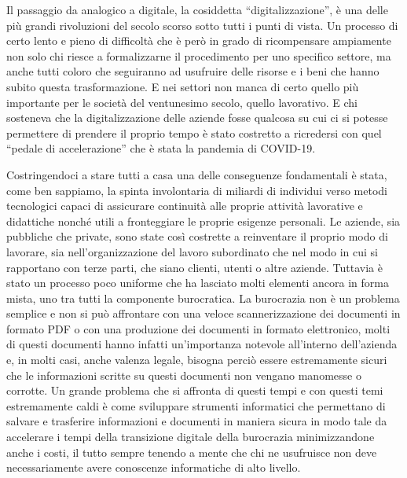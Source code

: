 Il passaggio da analogico a digitale, la cosiddetta “digitalizzazione”, è una delle più grandi
rivoluzioni del secolo scorso sotto tutti i punti di vista. Un processo di certo lento e pieno
di difficoltà che è però in grado di ricompensare ampiamente non solo chi riesce a
formalizzarne il procedimento per uno specifico settore, ma anche tutti coloro che
seguiranno ad usufruire delle risorse e i beni che hanno subito questa trasformazione.
E nei settori non manca di certo quello più importante per le società del ventunesimo secolo,
quello lavorativo. E chi sosteneva che la digitalizzazione delle aziende fosse qualcosa su cui
ci si potesse permettere di prendere il proprio tempo è stato costretto a ricredersi con quel
“pedale di accelerazione” che è stata la pandemia di COVID-19.

Costringendoci a stare tutti a casa una delle conseguenze fondamentali è stata,
come ben sappiamo, la spinta involontaria
di miliardi di individui verso metodi tecnologici capaci di assicurare continuità alle proprie
attività lavorative e didattiche nonché utili a fronteggiare le proprie esigenze personali.
Le aziende, sia pubbliche che private, sono state così costrette a reinventare il proprio modo
di lavorare, sia nell’organizzazione del lavoro subordinato che nel modo in cui si rapportano
con terze parti, che siano clienti, utenti o altre aziende. Tuttavia è stato un processo poco
uniforme che ha lasciato molti elementi ancora in forma mista,
uno tra tutti la componente burocratica. 
La burocrazia non è un problema semplice e non si può affrontare con una veloce
scannerizzazione dei documenti in formato PDF o con una produzione dei documenti
in formato elettronico, molti di questi documenti hanno infatti un’importanza notevole
all’interno dell’azienda e, in molti casi, anche valenza legale, bisogna perciò essere
estremamente sicuri che le informazioni scritte su questi documenti
non vengano manomesse o corrotte.
Un grande problema che si affronta di questi tempi e con questi temi estremamente
caldi è come sviluppare strumenti informatici che permettano di salvare e trasferire
informazioni e documenti in maniera sicura in modo tale da accelerare i tempi della
transizione digitale della burocrazia minimizzandone anche i costi, il tutto sempre
tenendo a mente che chi ne usufruisce non deve necessariamente avere conoscenze informatiche
di alto livello.

